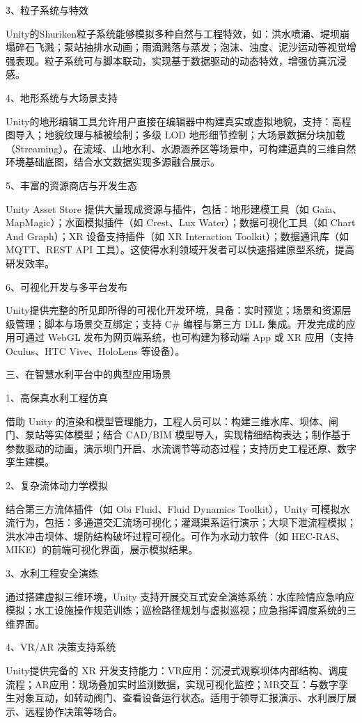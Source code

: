 3、粒子系统与特效

Unity的Shuriken粒子系统能够模拟多种自然与工程特效，如：洪水喷涌、堤坝崩塌碎石飞溅；泵站抽排水动画；雨滴溅落与蒸发；泡沫、浊度、泥沙运动等视觉增强表现。粒子系统可与脚本联动，实现基于数据驱动的动态特效，增强仿真沉浸感。

4、地形系统与大场景支持

Unity的地形编辑工具允许用户直接在编辑器中构建真实或虚拟地貌，支持：高程图导入；地貌纹理与植被绘制；多级 LOD 地形细节控制；大场景数据分块加载（Streaming）。在流域、山地水利、水源涵养区等场景中，可构建逼真的三维自然环境基础底图，结合水文数据实现多源融合展示。

5、丰富的资源商店与开发生态

Unity Asset Store 提供大量现成资源与插件，包括：地形建模工具（如 Gaia、MapMagic）；水面模拟插件（如 Crest、Lux Water）；数据可视化工具（如 Chart And Graph）；XR 设备支持插件（如 XR Interaction Toolkit）；数据通讯库（如 MQTT、REST API 工具）。这使得水利领域开发者可以快速搭建原型系统，提高研发效率。

6、可视化开发与多平台发布

Unity提供完整的所见即所得的可视化开发环境，具备：实时预览；场景和资源层级管理；脚本与场景交互绑定；支持 C\# 编程与第三方 DLL 集成。开发完成的应用可通过 WebGL 发布为网页端系统，也可构建为移动端 App 或 XR 应用（支持 Oculus、HTC Vive、HoloLens 等设备）。

三、在智慧水利平台中的典型应用场景

1、高保真水利工程仿真

借助 Unity 的渲染和模型管理能力，工程人员可以：构建三维水库、坝体、闸门、泵站等实体模型；结合 CAD/BIM 模型导入，实现精细结构表达；制作基于参数驱动的动画，演示坝门开启、水流调节等动态过程；支持历史工程还原、数字孪生建模。

2、复杂流体动力学模拟

结合第三方流体插件（如 Obi Fluid、Fluid Dynamics Toolkit），Unity 可模拟水流行为，包括：多通道交汇流场可视化；灌溉渠系运行演示；大坝下泄流程模拟；洪水冲击坝体、堤防结构破坏过程可视化。可作为水动力软件（如 HEC-RAS、MIKE）的前端可视化界面，展示模拟结果。

3、水利工程安全演练

通过搭建虚拟三维环境，Unity 支持开展交互式安全演练系统：水库险情应急响应模拟；水工设施操作规范训练；巡检路径规划与虚拟巡视；应急指挥调度系统的三维界面。

4、VR/AR 决策支持系统

Unity提供完备的 XR 开发支持能力：VR应用：沉浸式观察坝体内部结构、调度流程；AR应用：现场叠加实时监测数据，实现可视化监控；MR交互：与数字孪生对象互动，如转动阀门、查看设备运行状态。适用于领导汇报演示、水利展厅展示、远程协作决策等场合。


